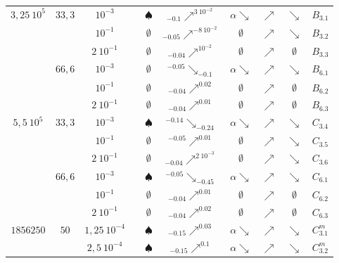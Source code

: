 \begin{table}[htbp]
\begin{tabular}{|c|c|c|c|c|c|c|c|c|c|}
			\hline
			\hline \multirow{6}{*}{$3,25\ 10^5$} & \multirow{3}{*}{$33,3$}
					& $10^{-3}$ & \accretionlot{} & $\spadesuit$ & ${}_{-0.1}\nearrow^{3\ 10^{ -2 }}$ & $\alpha\searrow$ & $\nearrow$ & $\searrow$ & $B_{3.1}$  \tabularnewline \cline{3-10}
					& & $10^{-1}$ & \accretionpeu{} & $\emptyset$ & ${}_{-0.05}\nearrow^{-8\ 10^{-2}}$ & $\emptyset$ & $\nearrow$ & $\searrow$ & $B_{3.2}$  \tabularnewline \cline{3-10}
					& & $2\ 10^{-1}$ & \accretionpeu{} & $\emptyset$ & ${}_{-0.04}\nearrow^{10^{-2}}$ & $\emptyset$ & $\nearrow$ & $\emptyset$ & $B_{3.3}$  \tabularnewline \cline{2-10}
				& \multirow{3}{*}{$66,6$}
					& $10^{-3}$ & \accretionpeu{} & $\emptyset$ & ${}^{-0.05}\searrow_{-0.1}$ & $\alpha\searrow$ & $\nearrow$ & $\searrow$ & $B_{6.1}$  \tabularnewline \cline{3-10}
					& & $10^{-1}$ & \accretionpeu{} & $\emptyset$ & ${}_{-0.04}\nearrow^{0.02}$ & $\emptyset$ & $\nearrow$ & $\emptyset$ & $B_{6.2}$  \tabularnewline \cline{3-10}
					& & $2\ 10^{-1}$ & \accretionpeu{} & $\emptyset$ & ${}_{-0.04}\nearrow^{0.01}$ & $\emptyset$ & $\nearrow$ & $\emptyset$ & $B_{6.3}$  \tabularnewline \cline{2-10}
			\hline
			\hline \multirow{6}{*}{$5,5\ 10^5$} & \multirow{3}{*}{$33,3$}
					& $10^{-3}$ & \accretionlot{} & $\spadesuit$ & ${}^{-0.14}\searrow_{-0.24}$ & $\alpha\searrow$ & $\nearrow$ & $\searrow$ & $C_{3.4}$  \tabularnewline \cline{3-10}
					& & $10^{-1}$ & \accretionlot{} & $\emptyset$ & ${}^{-0.05}\nearrow^{0.01}$ & $\emptyset$ & $\nearrow$ & $\searrow$ & $C_{3.5}$  \tabularnewline \cline{3-10}
					& & $2\ 10^{-1}$ & \accretionpeu{} & $\emptyset$ & ${}_{-0.04}\nearrow^{2\ 10^{-3}}$ & $\emptyset$ & $\nearrow$ & $\searrow$ & $C_{3.6}$  \tabularnewline \cline{2-10}
				& \multirow{3}{*}{$66,6$}
					& $10^{-3}$ & \accretionmoyen{} & $\spadesuit$ & ${}^{-0.05}\searrow_{-0.45}$ & $\alpha\searrow$ & $\nearrow$ & $\searrow$ & $C_{6.1}$  \tabularnewline \cline{3-10}
					& & $10^{-1}$ & \accretionpeu{} & $\emptyset$ & ${}_{-0.04}\nearrow^{0.01}$ & $\emptyset$ & $\nearrow$ & $\emptyset$ & $C_{6.2}$  \tabularnewline \cline{3-10}
					& & $2\ 10^{-1}$ & \accretionpeu{} & $\emptyset$ & ${}_{-0.04}\nearrow^{0.02}$ & $\emptyset$ & $\nearrow$ & $\emptyset$ & $C_{6.3}$  \tabularnewline \cline{2-10}
			\hline
			\hline \multirow{6}{*}{$1856250$} & \multirow{6}{*}{$50$}
					& $1,25\ 10^{-4}$ & \accretionlot{} & $\spadesuit$ & ${}_{-0.15}\nearrow^{0.03}$ & $\alpha\searrow$ & $\nearrow$ & $\searrow$ & $C_{3.1}^m$  \tabularnewline \cline{3-10}
					& & $2,5\ 10^{-4}$ & \accretionlot{} & $\spadesuit$ & ${}_{-0.15}\nearrow^{0.1}$ & $\alpha\searrow$ & $\nearrow$ & $\searrow$ & $C_{3.2}^m$  \tabularnewline \cline{3-10}

\end{tabular}
\end{table}
